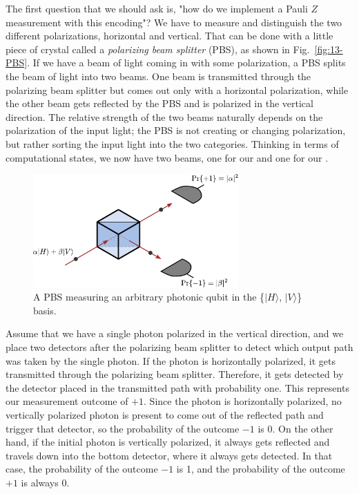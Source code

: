 The first question that we should ask is, "how do we implement a Pauli $Z$ measurement with this encoding"? We have to measure and distinguish the two different polarizations, horizontal and vertical. That can be done with a little piece of crystal called a \emph{polarizing beam splitter} (PBS), as shown in Fig.~\ref{fig:13-PBS}. If we have a beam of light coming in with some polarization, a PBS splits the beam of light into two beams. One beam is transmitted through the polarizing beam splitter but comes out only with a horizontal polarization, while the other beam gets reflected by the PBS and is polarized in the vertical direction. The relative strength of the two beams naturally depends on the polarization of the input light; the PBS is not creating or changing polarization, but rather sorting the input light into the two categories.
Thinking in terms of computational states, we now have two beams, one for our  and one for our .

\begin{figure}[t]
    \centering
    \includegraphics[width=0.7\textwidth]{lesson13/13-3_PBS_measure.pdf}
    \caption[A polarizing beam splitter (PBS) measuring a qubit]{A PBS measuring an arbitrary photonic qubit in the \{$|H\rangle$, $|V\rangle$\} basis.}
    \label{fig:13-PBS-measure}
\end{figure}

Assume that we have a single photon polarized in the vertical direction, and we place two detectors after the polarizing beam splitter to detect which output path was taken by the single photon. If the photon is horizontally polarized, it gets transmitted through the polarizing beam splitter.
Therefore, it gets detected by the detector placed in the transmitted path with probability one.
This represents our measurement outcome of $+1$. Since the photon is horizontally polarized, no vertically polarized photon is present to come out of the reflected path and trigger that detector, so the probability of the outcome $-1$ is 0.
On the other hand, if the initial photon is vertically polarized, it always gets reflected and travels down into the bottom detector, where it always gets detected.
In that case, the probability of the outcome $-1$ is 1, and the probability of the outcome $+1$ is always 0.

